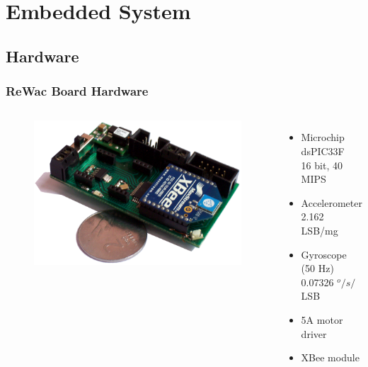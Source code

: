 \section{Embedded System}
\subsection*{Hardware}
\begin{frame}
\frametitle{ReWac Board Hardware}
    \begin{columns}
        \begin{figure}
        \centering
        \includegraphics[scale=0.2]{fig/rewac.png}
        \end{figure}
        
        \begin{itemize}
        \item
        Microchip dsPIC33F\\[0.05in]
        16 bit, 40 MIPS\\[0.1in]
        \item
        Accelerometer\\[0.05in]
        2.162 LSB/mg\\[0.1in]
        \item
        Gyroscope (50 Hz)\\[0.05in]
        0.07326 $^o/s/$LSB\\[0.1in]
        \item
        5A motor driver\\[0.1in]
        \item
        XBee module\\[0.1in]
        \end{itemize}
    \end{columns}
\end{frame}

